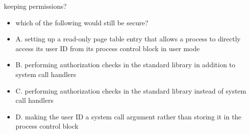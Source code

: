 \begin{frame}{keeping permissions?}
    \begin{itemize}
    \item which of the following would still be secure?
    \vspace{.5cm}
    \item A. setting up a read-only page table entry that allows a process to directly access its user ID
        from its process control block in user mode
    \item B. performing authorization checks in the standard library in addition to system call handlers
    \item C. performing authorization checks in the standard library instead of system call handlers
    \item D. making the user ID a system call argument rather than storing it in the process control block
    \end{itemize}
\end{frame}

